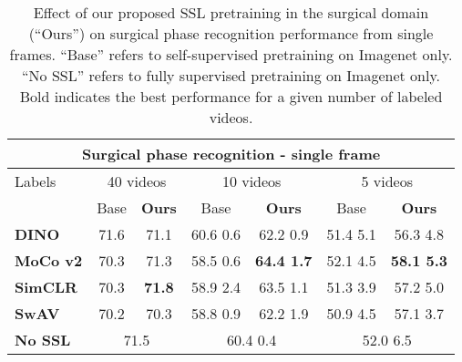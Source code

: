 \documentclass[times,twocolumn,final]{elsarticle}
\begin{document}
\begin{table*}[th!]
  \centering
  \caption{{\color{changetext} Effect of our proposed SSL pretraining in the surgical domain (``Ours'') on surgical phase recognition performance from single frames. ``Base'' refers to self-supervised pretraining on Imagenet only. ``No SSL'' refers to fully supervised pretraining on Imagenet only. Bold indicates the best performance for a given number of labeled videos.}}
  \label{tab:fcn_main}
  \begin{tabular*}{\textwidth}{l @{\extracolsep{\fill}}cccccc}
  \hline
  \multicolumn{7}{c}{\textbf{Surgical phase recognition  - single frame}}                      \\ \hline
  Labels & \multicolumn{2}{c}{40 videos} & \multicolumn{2}{c}{10 videos} & \multicolumn{2}{c}{5 videos} \\ \hline
         & Base    & \textbf{Ours}   & Base   & \textbf{Ours}   & Base    & \textbf{Ours}    \\
  \textbf{DINO}   & 71.6 & 71.1& 60.6  0.6 & 62.2  0.9 & 51.4  5.1 & 56.3  4.8\\
  \textbf{MoCo v2}   & 70.3 & 71.3& 58.5  0.6 & \textbf{64.4  1.7} & 52.1  4.5 & \textbf{58.1  5.3}\\
  \textbf{SimCLR}   & 70.3 & \textbf{71.8}& 58.9  2.4 & 63.5  1.1 & 51.3  3.9 & 57.2  5.0\\
  \textbf{SwAV} & 70.2 & 70.3& 58.8  0.9 & 62.2  1.9 & 50.9  4.5 & 57.1  3.7\\ \hline
  \textbf{No SSL} & \multicolumn{2}{c}{71.5}      & \multicolumn{2}{c}{60.4  0.4}     & \multicolumn{2}{c}{52.0  6.5} \\ \hline
  \end{tabular*}
\end{table*}
\end{document}
